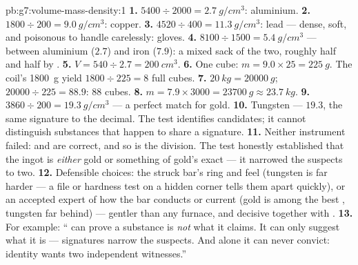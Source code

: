 \begin{solution}{pb:g7:volume-mass-density:1}
\textbf{1.} $5400 \div 2000 = \qty{2.7}{g/cm^3}$: aluminium.
\textbf{2.} $1800 \div 200 = \qty{9.0}{g/cm^3}$: copper.
\textbf{3.} $4520 \div 400 = \qty{11.3}{g/cm^3}$: lead --- dense,
soft, and poisonous to handle carelessly: gloves.
\textbf{4.} $8100 \div 1500 = \qty{5.4}{g/cm^3}$ --- between
aluminium ($2.7$) and iron ($7.9$): a mixed sack of the two,
roughly half and half by .
\textbf{5.} $V = 540 \div 2.7 = \qty{200}{cm^3}$.
\textbf{6.} One cube: $m = 9.0 \times 25 = \qty{225}{g}$. The
coil's \qty{1800}{g} yield $1800 \div 225 = 8$ full cubes.
\textbf{7.} $\qty{20}{kg} = \qty{20000}{g}$; $20000 \div 225 =
88.9$: $88$ cubes.
\textbf{8.} $m = 7.9 \times 3000 = \qty{23700}{g} \approx
\qty{23.7}{kg}$.
\textbf{9.} $3860 \div 200 = \qty{19.3}{g/cm^3}$ --- a perfect
match for gold.
\textbf{10.} Tungsten ---  $19.3$, the same signature to
the decimal. The  test identifies candidates; it cannot
distinguish substances that happen to share a signature.
\textbf{11.} Neither instrument failed:  and  are
correct, and so is the division. The test honestly established
that the ingot is \emph{either} gold or something of gold's exact
 --- it narrowed the suspects to two.
\textbf{12.} Defensible choices: the struck bar's ring and feel
(tungsten is far harder --- a file or hardness test on a hidden
corner tells them apart quickly), or an accepted expert 
of how the bar conducts  or current (gold is among the best
, tungsten far behind) --- gentler than any furnace,
and decisive together with .
\textbf{13.} For example: `` can prove a substance is
\emph{not} what it claims. It can only suggest what it is ---
signatures narrow the suspects. And alone it can never convict:
identity wants two independent witnesses.''
\end{solution}

